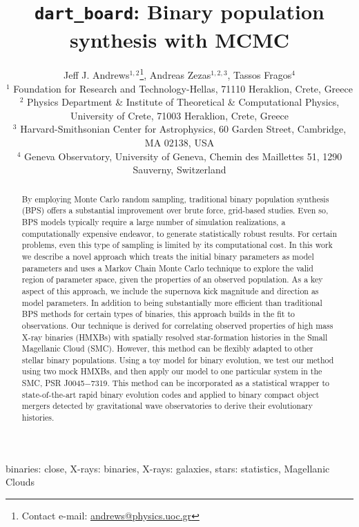 \documentclass[usenatbib]{mnras}
\title[dart_board: Pop. synth. with MCMC]{{\tt dart_board}: Binary population synthesis with MCMC}
\author[J. J. Andrews et al.]{Jeff J. Andrews$^{1,2}$\thanks{Contact e-mail: \href{mailto:andrews@physics.uoc.gr}{andrews@physics.uoc.gr}}, Andreas Zezas$^{1,2,3}$, Tassos Fragos$^{4}$ \\
$^1$ Foundation for Research and Technology-Hellas, 71110 Heraklion, Crete, Greece \\
$^2$ Physics Department \& Institute of Theoretical \& Computational Physics, University of Crete, 71003 Heraklion, Crete, Greece \\
$^3$ Harvard-Smithsonian Center for Astrophysics, 60 Garden Street, Cambridge, MA 02138, USA \\
$^4$ Geneva Observatory, University of Geneva, Chemin des Maillettes 51, 1290 Sauverny, Switzerland }
\begin{document}
\label{firstpage}
\pagerange{\pageref{firstpage}--\pageref{lastpage}}
\maketitle

\begin{abstract}
By employing Monte Carlo random sampling, traditional binary population synthesis (BPS) offers a substantial improvement over brute force, grid-based studies. Even so, BPS models typically require a large number of simulation realizations, a computationally expensive endeavor, to generate statistically robust results. For certain problems, even this type of sampling is limited by its computational cost. In this work we describe a novel approach which treats the initial binary parameters as model parameters and uses a Markov Chain Monte Carlo technique to explore the valid region of parameter space, given the properties of an observed population. As a key aspect of this approach, we include the supernova kick magnitude and direction as model parameters. In addition to being substantially more efficient than traditional BPS methods for certain types of binaries, this approach builds in the fit to observations. Our technique is derived for correlating observed properties of high mass X-ray binaries (HMXBs) with spatially resolved star-formation histories in the Small Magellanic Cloud (SMC). However, this method can be flexibly adapted to other stellar binary populations. Using a toy model for binary evolution, we test our method using two mock HMXBs, and then apply our model to one particular system in the SMC, PSR J0045$-$7319. This method can be incorporated as a statistical wrapper to state-of-the-art rapid binary evolution codes and applied to binary compact object mergers detected by gravitational wave observatories to derive their evolutionary histories.
\end{abstract}

\begin{keywords}
binaries: close, X-rays: binaries, X-rays: galaxies, stars: statistics, Magellanic Clouds
\end{keywords}
\end{document}

